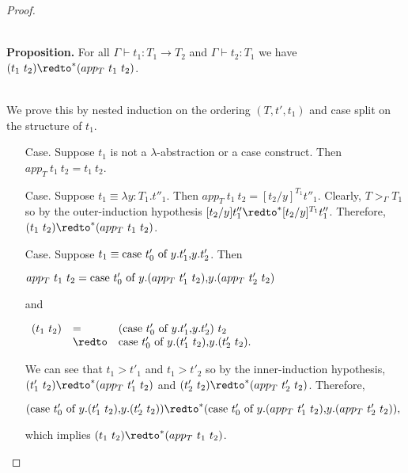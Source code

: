 \begin{proof}
\begin{itemize}
    \ \\
    {\bf Proposition.} For all $\Gamma \vdash t_1:T_1 \to T_2$ and $\Gamma \vdash t_2:T_1$ we have
    $(t_1\ t_2) \redto^* (app_T\ t_1\ t_2)$.
    
    \ \\
    We prove this by nested induction on the ordering $(T, t', t_1)$ and case split on the
    structure of $t_1$.  
    \begin{itemize}
    \item[Case.] Suppose $t_1$ is not a $\lambda$-abstraction or a case construct.  Then 
      $app_T\ t_1\ t_2 = t_1\ t_2$.
      
    \item[Case.] Suppose $t_1 \equiv \lambda y:T_1.t''_1$.  Then $app_T\ t_1\  t_2 = [t_2/y]^{T_1} t''_1$.
      Clearly, $T >_\Gamma T_1$ so by the outer-induction hypothesis 
      $[t_2/y]t''_1 \redto^* [t_2/y]^{T_1} t''_1$.  Therefore, $(t_1\ t_2) \redto^* (app_T\ t_1\ t_2)$.
      
    \item[Case.] Suppose $t_1 \equiv \mbox{case}\ t'_0\ \text{of}\ y\text{.}t'_1\text{,}y\text{.}t'_2$.  Then 
      \begin{center}
        \begin{math}
          app_T\ t_1\ t_2 = \mbox{case}\ t'_0\ \text{of}\ y\text{.}(app_T\ t'_1\ t_2)\text{,}y\text{.}(app_T\ t'_2\ t_2)
        \end{math}
      \end{center}
      and
      \begin{center}
        \begin{math}
          \begin{array}{lll}
            (t_1\ t_2) & =      & (\ccon{t'_0}{y}{t'_1}{t'_2})\ t_2\\
            & \redto & \ccon{t'_0}{y}{(t'_1\ t_2)}{(t'_2\ t_2)}.
          \end{array}
        \end{math}
      \end{center}
      We can see that $t_1 > t'_1$ and $t_1 > t'_2$ so by the inner-induction hypothesis, $(t'_1\ t_2) \redto^* (app_T\ t'_1\ t_2)$ and
      $(t'_2\ t_2) \redto^* (app_T\ t'_2\ t_2)$.  Therefore, 
      \begin{center}
        \begin{math}
          (\ccon{t'_0}{y}{(t'_1\ t_2)}{(t'_2\ t_2)}) \redto^* (\ccon{t'_0}{y}{(app_T\ t'_1\ t_2)}{(app_T\ t'_2\ t_2)}),
        \end{math}
      \end{center}
      which implies $(t_1\ t_2) \redto^* (app_T\ t_1\ t_2)$.
    \end{itemize} 
  \end{itemize}
\end{proof}

